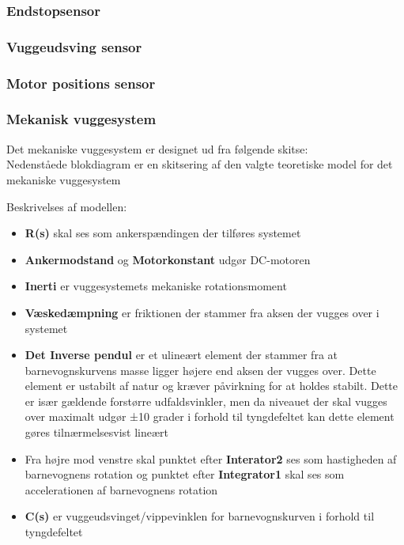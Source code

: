 
\subsubsection{Endstopsensor}

\subsubsection{Vuggeudsving sensor}

\subsubsection{Motor positions sensor}

\subsubsection{Mekanisk vuggesystem}
Det mekaniske vuggesystem er designet ud fra følgende skitse: \\



Nedenståede blokdiagram er en skitsering af den valgte teoretiske model for det mekaniske vuggesystem


Beskrivelses af modellen:
\begin{itemize}
\item \textbf{R(s)} skal ses som ankerspændingen der tilføres systemet
\item \textbf{Ankermodstand} og \textbf{Motorkonstant} udgør DC-motoren
\item \textbf{Inerti} er vuggesystemets mekaniske rotationsmoment
\item \textbf{Væskedæmpning} er friktionen der stammer fra aksen der vugges over i systemet
\item \textbf{Det Inverse pendul} er et ulineært element der stammer fra at barnevognskurvens masse ligger højere end aksen der vugges over. Dette element er ustabilt af natur og kræver påvirkning for at holdes stabilt. Dette er især gældende forstørre udfaldsvinkler, men da niveauet der skal vugges over maximalt udgør ±10 grader i forhold til tyngdefeltet kan dette element gøres tilnærmelsesvist lineært
\item Fra højre mod venstre skal punktet efter \textbf{Interator2} ses som hastigheden af barnevognens rotation og punktet efter \textbf{Integrator1} skal ses som accelerationen af barnevognens rotation
\item \textbf{C(s)} er vuggeudsvinget/vippevinklen for barnevognskurven i forhold til tyngdefeltet

\end{itemize}

